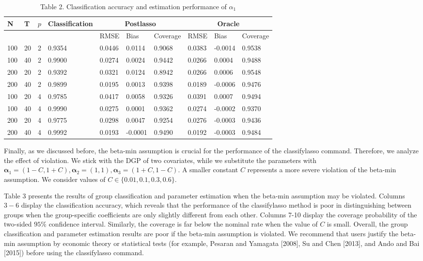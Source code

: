 \documentclass[10pt]{article}
\begin{document}
\begin{table}[h]
\begin{center}
\captionsetup{labelformat=empty}
\caption{Table 2. Classification accuracy and estimation performance of $\alpha_{1}$}
\begin{tabular}{|l|l|l|l|l|l|l|l|l|l|}
\hline
\multirow[b]{2}{*}{N} & \multirow[b]{2}{*}{T} & \multirow[b]{2}{*}{$p$} & \multirow[b]{2}{*}{Classification} & \multicolumn{3}{|c|}{Postlasso} & \multicolumn{3}{|c|}{Oracle} \\
\hline
 &  &  &  & RMSE & Bias & Coverage & RMSE & Bias & Coverage \\
\hline
100 & 20 & 2 & 0.9354 & 0.0446 & 0.0114 & 0.9068 & 0.0383 & -0.0014 & 0.9538 \\
\hline
100 & 40 & 2 & 0.9900 & 0.0274 & 0.0024 & 0.9442 & 0.0266 & 0.0004 & 0.9488 \\
\hline
200 & 20 & 2 & 0.9392 & 0.0321 & 0.0124 & 0.8942 & 0.0266 & 0.0006 & 0.9548 \\
\hline
200 & 40 & 2 & 0.9899 & 0.0195 & 0.0013 & 0.9398 & 0.0189 & -0.0006 & 0.9476 \\
\hline
100 & 20 & 4 & 0.9785 & 0.0417 & 0.0058 & 0.9326 & 0.0391 & 0.0007 & 0.9494 \\
\hline
100 & 40 & 4 & 0.9990 & 0.0275 & 0.0001 & 0.9362 & 0.0274 & -0.0002 & 0.9370 \\
\hline
200 & 20 & 4 & 0.9775 & 0.0298 & 0.0047 & 0.9254 & 0.0276 & -0.0003 & 0.9436 \\
\hline
200 & 40 & 4 & 0.9992 & 0.0193 & -0.0001 & 0.9490 & 0.0192 & -0.0003 & 0.9484 \\
\hline
\end{tabular}
\end{center}
\end{table}

Finally, as we discussed before, the beta-min assumption is crucial for the performance of the classifylasso command. Therefore, we analyze the effect of violation. We stick with the DGP of two covariates, while we substitute the parameters with $\boldsymbol{\alpha}_{1}=(1-C, 1+C), \boldsymbol{\alpha}_{2}=(1,1), \boldsymbol{\alpha}_{3}=(1+C, 1-C)$. A smaller constant $C$ represents a more severe violation of the beta-min assumption. We consider values of $C \in\{0.01,0.1,0.3,0.6\}$.

Table 3 presents the results of group classification and parameter estimation when the beta-min assumption may be violated. Columns $3-6$ display the classification accuracy, which reveals that the performance of the classifylasso method is poor in distinguishing between groups when the group-specific coefficients are only slightly different from each other. Columns 7-10 display the coverage probability of the two-sided $95 \%$ confidence interval. Similarly, the coverage is far below the nominal rate when the value of $C$ is small. Overall, the group classification and parameter estimation results are poor if the beta-min assumption is violated. We recommend that users justify the beta-min assumption by economic theory or statistical tests (for example, Pesaran and Yamagata [2008], Su and Chen [2013], and Ando and Bai [2015]) before using the classifylasso command.
\end{document}
